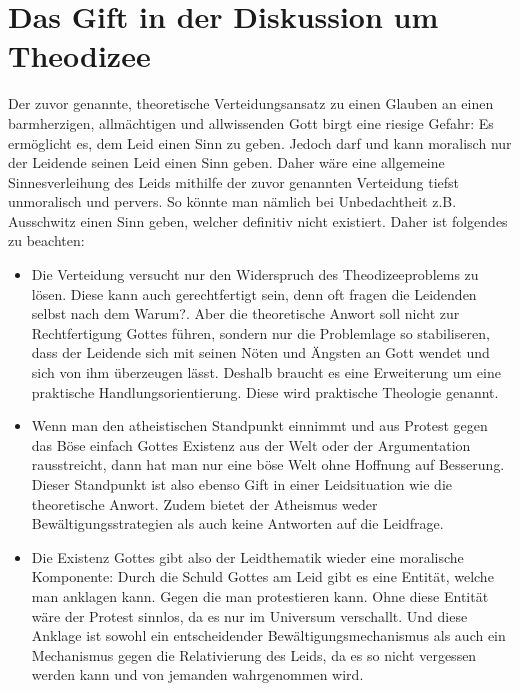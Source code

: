 \section{Das Gift in der Diskussion um Theodizee}
Der zuvor genannte, theoretische Verteidungsansatz zu einen Glauben an einen barmherzigen, allmächtigen und allwissenden Gott birgt eine riesige Gefahr: Es ermöglicht es, dem Leid einen Sinn zu geben. Jedoch darf und kann moralisch nur der Leidende seinen Leid einen Sinn geben. Daher wäre eine allgemeine Sinnesverleihung des Leids mithilfe der zuvor genannten Verteidung tiefst unmoralisch und pervers. So könnte man nämlich bei Unbedachtheit z.B. Ausschwitz einen Sinn geben, welcher definitiv nicht existiert. Daher ist folgendes zu beachten:
\begin{itemize}
	\item Die Verteidung versucht nur den Widerspruch des Theodizeeproblems zu lösen. Diese kann auch gerechtfertigt sein, denn oft fragen die Leidenden selbst nach dem \glqq Warum?\grqq{}. Aber die theoretische Anwort soll nicht zur Rechtfertigung Gottes führen, sondern nur die Problemlage so stabiliseren, dass der Leidende sich mit seinen Nöten und Ängsten an Gott wendet und sich von ihm überzeugen lässt. Deshalb braucht es eine Erweiterung um eine praktische Handlungsorientierung. Diese wird praktische Theologie genannt.
	\item Wenn man den atheistischen Standpunkt einnimmt und aus Protest gegen das Böse einfach Gottes Existenz aus der Welt oder der Argumentation rausstreicht, dann hat man nur eine böse Welt ohne Hoffnung auf Besserung. Dieser Standpunkt ist also ebenso Gift in einer Leidsituation wie die theoretische Anwort. Zudem bietet der Atheismus weder Bewältigungsstrategien als auch keine Antworten auf die Leidfrage.
	\item Die Existenz Gottes gibt also der Leidthematik wieder eine moralische Komponente: Durch die Schuld Gottes am Leid gibt es eine Entität, welche man anklagen kann. Gegen die man protestieren kann. Ohne diese Entität wäre der Protest sinnlos, da es nur im Universum verschallt. Und diese Anklage ist sowohl ein entscheidender Bewältigungsmechanismus als auch ein Mechanismus gegen die Relativierung des Leids, da es so nicht vergessen werden kann und von jemanden wahrgenommen wird.
\end{itemize}

